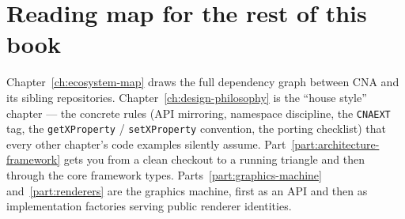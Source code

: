 \section{Reading map for the rest of this book}

Chapter~\ref{ch:ecosystem-map} draws the full dependency graph between CNA and its sibling
repositories. Chapter~\ref{ch:design-philosophy} is the ``house style'' chapter --- the
concrete rules (API mirroring, namespace discipline, the \texttt{CNAEXT} tag, the
\texttt{getXProperty} / \texttt{setXProperty} convention, the porting checklist) that every
other chapter's code examples silently assume. Part~\ref{part:architecture-framework} gets you from a clean checkout to a
running triangle and then through the core framework types. Parts~\ref{part:graphics-machine}
and~\ref{part:renderers} are the
graphics machine, first as an API and then as \RendererFamilyCount{} implementation factories serving \RendererIdentityCount{} public
renderer identities.
